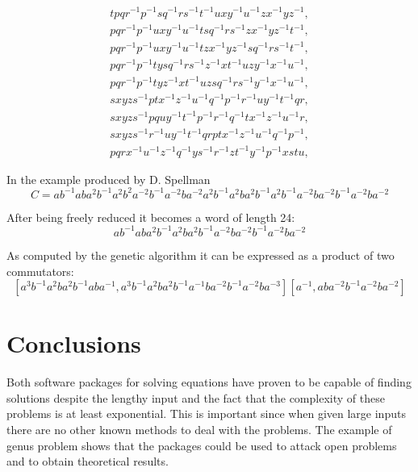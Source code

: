 \documentclass{article}
\begin{document}
\begin{eqnarray}
t p q r^{-1} p^{-1} s q^{-1} r s^{-1} t^{-1} u x y^{-1} u^{-1} z x^{-1} 
y z^{-1}, \\
p q r^{-1} p^{-1} u x y^{-1} u^{-1} t s q^{-1} r s^{-1} z x^{-1} y z^{-1} t^{-1},\\
p q r^{-1} p^{-1} u x y^{-1} u^{-1} t z x^{-1} y z^{-1} s q^{-1} r s^{-1} t^{-1},\\
p q r^{-1} p^{-1} t y s q^{-1} r s^{-1} z^{-1} x t^{-1} u z y^{-1} x^{-1} u^{-1},\\
p q r^{-1} p^{-1} t y z^{-1} x t^{-1} u z s q^{-1} r s^{-1} y^{-1} x^{-1} u^{-1},\\
s x y z s^{-1} p t x^{-1} z^{-1} u^{-1} q^{-1} p^{-1} r^{-1} u y^{-1} t^{-1} q r,\\
s x y z s^{-1} p q u y^{-1} t^{-1} p^{-1} r^{-1} q^{-1} t x^{-1} z^{-1} u^{-1} r,\\
s x y z s^{-1} r^{-1} u y^{-1} t^{-1} q r p t x^{-1} z^{-1} u^{-1} q^{-1} p^{-1},\\
p q r x^{-1} u^{-1} z^{-1} q^{-1} y s^{-1} r^{-1} z t^{-1} y^{-1} p^{-1} x s t u, 
\end{eqnarray}

\vspace{3mm}
In the example produced by D. Spellman 
\[
C = a b^{-1} a b a^2 b^{-1} a^2 b^2 a^{-2} b^{-1} a^{-2} b a^{-2} a^2 b^{-1}
 a^2 b a^2 b^{-1} a^2 b^{-1} a^{-2} b a^{-2} b^{-1} a^{-2} b a^{-2}
\]

After being freely reduced it becomes a word of length 24:
\[
a b^{-1} a b a^2 b^{-1} a^2 b a^2 b^{-1} a^{-2} b a^{-2} b^{-1} a^{-2} b a^{-2}
\]

As computed by the genetic algorithm it can be expressed as a product
of two commutators:
\[
[a^3 b^{-1} a^2 b a^2 b^{-1} a b a^{-1}, a^3 b^{-1} a^2 b a^2 b^{-1} a^{-1} b a^{-2} b^{-1} a^{-2} b a^{-3}] [a^{-1}, a b a^{-2} b^{-1} a^{-2} b a^{-2}]
\]


\section{Conclusions}

Both software packages for solving equations have proven to be capable
of finding solutions despite the lengthy input and the fact that the
complexity of these problems is at least exponential. This is
important since when given large inputs there are no other known
methods to deal with the problems. The example of genus problem shows
that the packages could be used to attack open problems and to obtain
theoretical results.
\end{document}
